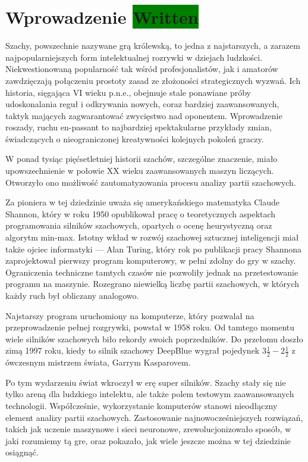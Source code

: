 \section{Wprowadzenie \colorbox{green}{Written}}
\label{sec:wprowadzenie}

Szachy, powszechnie nazywane grą królewską, to jedna z najstarszych, a zarazem najpopularniejszych form intelektualnej rozrywki w dziejach ludzkości.
Niekwestionowaną popularność tak wśród profesjonalistów, jak i amatorów zawdzięczają połączeniu prostoty zasad ze złożoności strategicznych wyzwań.
Ich historia, sięgająca VI wieku p.n.e., obejmuje stale ponawiane próby udoskonalania reguł i odkrywania nowych, coraz bardziej zaawansowanych, taktyk mających zagwarantować zwycięstwo nad oponentem.
Wprowadzenie roszady, ruchu en-passant to najbardziej spektakularne przykłady zmian, świadczących o nieograniczonej kreatywności kolejnych pokoleń graczy.


W ponad tysiąc pięćsetletniej historii szachów, szczególne znaczenie, miało upowszechnienie w połowie XX wieku zaawansowanych maszyn liczących.
Otworzyło ono możliwość zautomatyzowania procesu analizy partii szachowych.


Za pioniera w tej dziedzinie uważa się amerykańskiego matematyka Claude Shannon, który w roku 1950 opublikował pracę o teoretycznych aspektach programowania silników szachowych, opartych o ocenę heurystyczną oraz algorytm min-max.
Istotny wkład w rozwój szachowej sztucznej inteligencji miał także ojciec informatyki — Alan Turing, który rok po publikacji pracy Shannona zaprojektował pierwszy program komputerowy, w pełni zdolny do gry w szachy.
Ograniczenia techniczne tamtych czasów nie pozwoliły jednak na przetestowanie programu na maszynie.
Rozegrano niewielką liczbę partii szachowych, w których każdy ruch był obliczany analogowo.


Najstarszy program uruchomiony na komputerze, który pozwalał na przeprowadzenie pełnej rozgrywki, powstał w 1958 roku.
Od tamtego momentu wiele silników szachowych biło rekordy swoich poprzedników.
Do przełomu doszło zimą 1997 roku, kiedy to silnik szachowy DeepBlue wygrał pojedynek $3\frac{1}{2} - 2\frac{1}{2}$ z ówczesnym mistrzem świata, Garrym Kasparovem.


Po tym wydarzeniu świat wkroczył w erę super silników.
Szachy stały się nie tylko areną dla ludzkiego intelektu, ale także polem testowym zaawansowanych technologii.
Współcześnie, wykorzystanie komputerów stanowi nieodłączny element analizy partii szachowych.
Zastosowanie najnowocześniejszych rozwiązań, takich jak uczenie maszynowe i sieci neuronowe, zrewolucjonizowało sposób, w jaki rozumiemy tą gre, oraz pokazało, jak wiele jeszcze można w tej dziedzinie osiągnąć.

